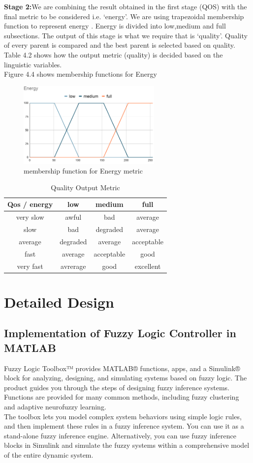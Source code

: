 \textbf{Stage 2:}We are combining the result obtained in the first stage (QOS) with the final metric to be  
considered i.e. ‘energy’. We are using trapezoidal membership function to represent energy . Energy is divided into low,medium and full subsections. The output of this stage is what we require that is ‘quality’. Quality of every parent is compared and the best parent is selected based on quality.\\
\noindent Table 4.2 shows how the output metric (quality) is decided based on the linguistic variables.\\
Figure 4.4 shows membership functions for Energy 
\begin{figure}[H]
\centering
\includegraphics[width=70mm]{Energy.png}
\caption{membership function for Energy metric}
\end{figure}
\begin{table}[!ht]
\centering
\begin{tabular}{||c||c|c|c||}
\hline\hline
Qos / energy & low & medium & full\\
\hline\hline
very slow & awful & bad & average\\
\hline
slow & bad & degraded & average\\
\hline
average & degraded & average & acceptable\\
\hline
fast & average & acceptable & good\\
\hline
very fast & avrerage & good & excellent\\
\hline\hline
  \end{tabular}
  \caption{Quality Output Metric}
\end{table}

\section{Detailed Design} \label{Detailed Design}
\subsection{Implementation of Fuzzy Logic Controller in MATLAB} \label{Implementation of Fuzzy Logic Controller in MATLAB}
Fuzzy Logic Toolbox™ provides MATLAB® functions, apps, and a Simulink® block for analyzing, designing, and simulating systems based on fuzzy logic. The product guides you through the steps of designing fuzzy inference systems. Functions are provided for many common methods, including fuzzy clustering and adaptive neurofuzzy learning.\\
The toolbox lets you model complex system behaviors using simple logic rules, and then implement these rules in a fuzzy inference system. You can use it as a stand-alone fuzzy inference engine. Alternatively, you can use fuzzy inference blocks in Simulink and simulate the fuzzy systems within a comprehensive model of the entire dynamic system.
